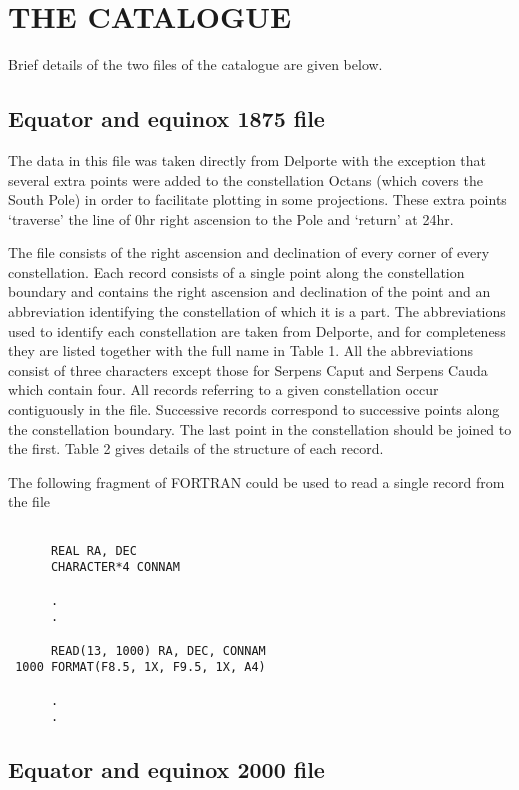 \section{THE CATALOGUE}

Brief details of the two files of the catalogue are given below.

\subsection{Equator and equinox 1875 file}

The data in this file was taken directly from Delporte with the exception that
several extra points were added to the constellation Octans (which covers the
South Pole) in order to facilitate plotting in some projections. These extra
points `traverse' the line of 0hr right ascension to the Pole and `return' at
24hr.

The file consists of the right ascension and declination of every corner of
every constellation. Each record consists of a single point along the
constellation boundary and contains the right ascension and declination of the
point and an abbreviation identifying the constellation of which it is a part.
The abbreviations used to identify each constellation are taken from Delporte,
and for completeness they are listed together with the full name in Table 1. All
the abbreviations consist of three characters except those for Serpens Caput and
Serpens Cauda which contain four. All records referring to a given constellation
occur contiguously in the file. Successive records correspond to successive
points along the constellation boundary. The last point in the constellation
should be joined to the first. Table 2 gives details of the structure of each
record.

The following fragment of FORTRAN could be used to read a single record from the
file

\begin{verbatim}

      REAL RA, DEC
      CHARACTER*4 CONNAM

      .
      .

      READ(13, 1000) RA, DEC, CONNAM
 1000 FORMAT(F8.5, 1X, F9.5, 1X, A4)

      .
      .

\end{verbatim}

\subsection{Equator and equinox 2000 file}

